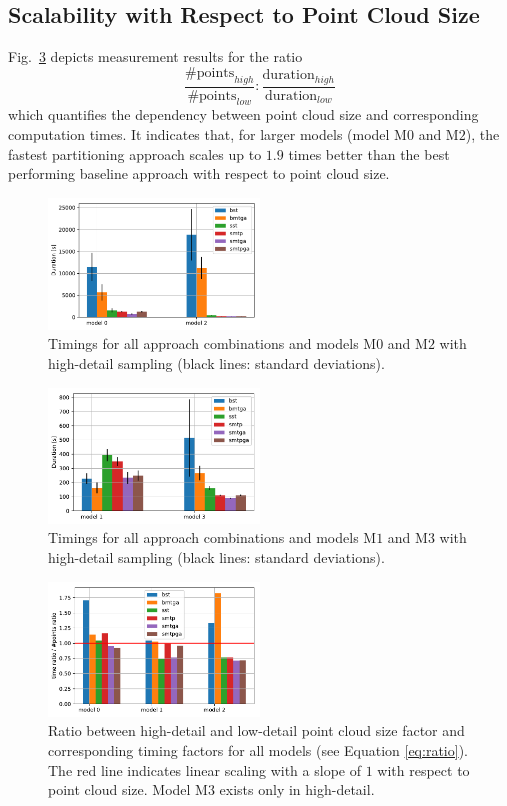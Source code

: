 \subsection{Scalability with Respect to Point Cloud Size}  
Fig.~\ref{fig:graph3} depicts measurement results for the ratio
\begin{equation} \label{eq:ratio}
\frac{\#\text{points}_{high}}{\#\text{points}_{low}} : \frac{\text{duration}_{high}}{\text{duration}_{low}}
\end{equation}
which quantifies the dependency between point cloud size and corresponding computation times.
It indicates that, for larger models (model M$0$ and M$2$), the fastest partitioning approach scales up to $1.9$ times better than the best performing baseline approach with respect to point cloud size.
\begin{figure}[htb]
	\centering
	\includegraphics[width=0.5\textwidth]{figures/g1.pdf}
	\caption{Timings for all approach combinations and models M$0$ and M$2$ with high-detail sampling (black lines: standard deviations).}
	\label{fig:graph1}
\end{figure}
\begin{figure}[htb]
	\centering
	\includegraphics[width=0.5\textwidth]{figures/g4.pdf}
	\caption{Timings for all approach combinations and models M$1$ and M$3$ with high-detail sampling (black lines: standard deviations).}
	\label{fig:graph4}
\end{figure}
\begin{figure}[htb]
	\centering
	\includegraphics[width=0.5\textwidth]{figures/g3.pdf}
	\caption{Ratio between high-detail and low-detail point cloud size factor and corresponding timing factors for all models (see Equation \ref{eq:ratio}). The red line indicates linear scaling with a slope of $1$ with respect to point cloud size. Model M$3$ exists only in high-detail.}
	\label{fig:graph3}
\end{figure}
